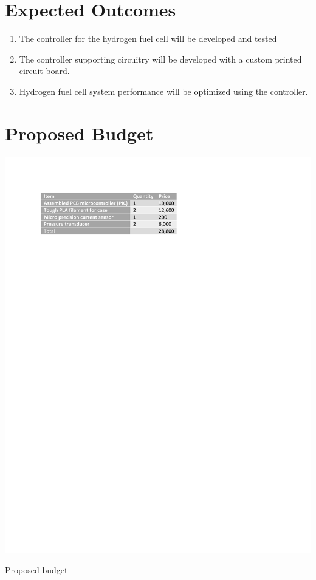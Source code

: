 \section{Expected Outcomes}
\begin{enumerate}
\item The controller for the hydrogen fuel cell will be developed and tested
\item The controller supporting circuitry will be developed with a custom printed circuit board.
\item Hydrogen fuel cell system performance will be optimized using the controller.
\end{enumerate}
\section{Proposed Budget}
\begin{table}[!h]
\includegraphics{Figures/budget}
\caption{Proposed budget}
\end{table}
